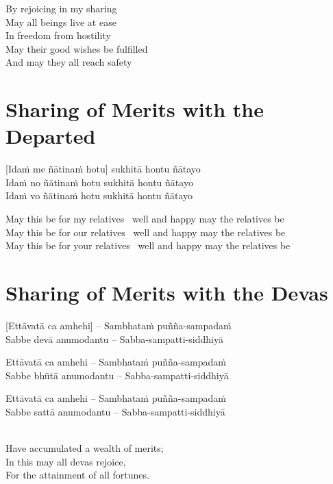 \begin{cprenglish}
  By rejoicing in my sharing\\
  May all beings live at ease\\
  In freedom from hostility\\
  May their good wishes be fulfilled\\
  And may they all reach safety
\end{cprenglish}

\suttaRef{[Thai]}

\clearpage

\section{Sharing of Merits with the Departed}
\label{sharing-merits-departed}

[Idaṁ me ñātinaṁ hotu] sukhitā hontu ñātayo\\
Idaṁ no ñātinaṁ hotu sukhitā hontu ñātayo\\
Idaṁ vo ñātinaṁ hotu sukhitā hontu ñātayo

\begin{cprenglish}
  May this be for my relatives \breathmark\ well and happy may the relatives be\\
  May this be for our relatives \breathmark\ well and happy may the relatives be\\
  May this be for your relatives \breathmark\ well and happy may the relatives be
\end{cprenglish}

\suttaRef{[Thai]}

\clearpage

\section{Sharing of Merits with the Devas}
\label{sharing-merits-devas}

[Ettāvatā ca amhehi] – Sambhataṁ puñña-sampadaṁ\\
Sabbe devā anumodantu – Sabba-sampatti-siddhiyā

Ettāvatā ca amhehi – Sambhataṁ puñña-sampadaṁ\\
Sabbe bhūtā anumodantu – Sabba-sampatti-siddhiyā

Ettāvatā ca amhehi – Sambhataṁ puñña-sampadaṁ\\
Sabbe sattā anumodantu – Sabba-sampatti-siddhiyā

\begin{cprenglish}
  \\
  Have accumulated a wealth of merits;\\
  In this may all devas rejoice,\\
  For the attainment of all fortunes.
\end{cprenglish}

